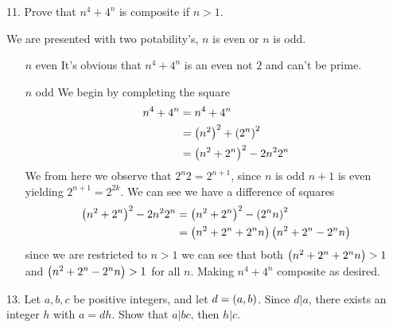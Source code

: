 \newpage
\begin{mdframed}[style=darkQuesion]
11. Prove that $n^4+4^n$ is composite if $n>1$.
\end{mdframed}

\begin{mdframed}[style=darkAnswer,frametitle={Joe Starr}]
We are presented with two potability's, $n$ is even or $n$ is odd.
\begin{itemize}[align=left]
    \item [$n$ even]{\hspace{.5in}\newline
        It's obvious that $n^4+4^n$ is an even not $2$ and can't be prime. 
    }
    \item [$n$ odd]{\hspace{.5in}\newline
    We begin by completing the square 
    \begin{align*}
        n^4+4^n&= n^4+4^n\\
        &=\left(n^2\right)^2+\left(2^n\right)^2\\
        &=\left(n^2+2^n\right)^2-2n^2 2^n
    \end{align*}
    We from here we observe that $2^n2=2^{n+1}$, since $n$ is odd $n+1$ is even 
    yielding $2^{n+1}=2^{2k}$. We can see we have a difference of squares
    \begin{align*}
        \left(n^2+2^n\right)^2-2n^2 2^n&=\left(n^2+2^n\right)^2-\left(2^nn\right)^2\\
        &=\left(n^2+2^n+2^nn\right)\left(n^2+2^n-2^nn\right)
    \end{align*}
    since we are restricted to $n>1$ we can see that both $\left(n^2+2^n+2^nn\right)>1$
    and $\left(n^2+2^n-2^nn\right)>1$ for all $n$. Making $n^4+4^n$ composite as 
    desired. 
    }
\end{itemize}
\end{mdframed}
\newpage
\begin{mdframed}[style=darkQuesion]
13. Let $a,b,c$  be positive integers, and let $d=\left(a,b\right)$. Since $d\vert a$, 
there exists an integer $h$ with $a=dh$. Show that $a\vert bc$, then $h\vert c$. 
\end{mdframed}

